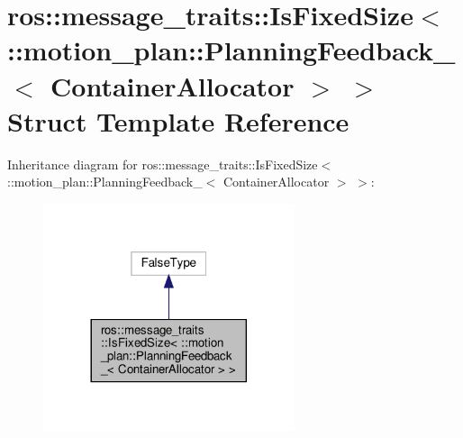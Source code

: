 \hypertarget{structros_1_1message__traits_1_1IsFixedSize_3_01_1_1motion__plan_1_1PlanningFeedback___3_01ContainerAllocator_01_4_01_4}{}\section{ros\+:\+:message\+\_\+traits\+:\+:Is\+Fixed\+Size$<$ \+:\+:motion\+\_\+plan\+:\+:Planning\+Feedback\+\_\+$<$ Container\+Allocator $>$ $>$ Struct Template Reference}
\label{structros_1_1message__traits_1_1IsFixedSize_3_01_1_1motion__plan_1_1PlanningFeedback___3_01ContainerAllocator_01_4_01_4}


Inheritance diagram for ros\+:\+:message\+\_\+traits\+:\+:Is\+Fixed\+Size$<$ \+:\+:motion\+\_\+plan\+:\+:Planning\+Feedback\+\_\+$<$ Container\+Allocator $>$ $>$\+:
\nopagebreak
\begin{figure}[H]
\begin{center}
\leavevmode
\includegraphics[width=209pt]{structros_1_1message__traits_1_1IsFixedSize_3_01_1_1motion__plan_1_1PlanningFeedback___3_01Contaaf797639c209bd3c8af907dff6368439}
\end{center}
\end{figure}


